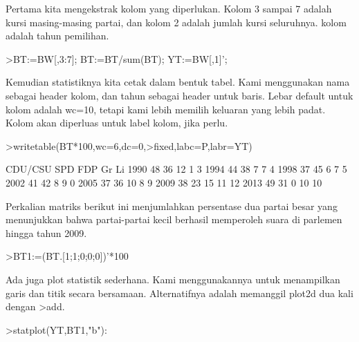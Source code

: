 \documentclass[a4paper,10pt]{article}
\begin{document}
\begin{eulernotebook}
\begin{eulercomment}
\begin{eulercomment}
\begin{eulercomment}
Pertama kita mengekstrak kolom yang diperlukan. Kolom 3 sampai 7
adalah kursi masing-masing partai, dan kolom 2 adalah jumlah kursi
seluruhnya. kolom adalah tahun pemilihan.
\end{eulercomment}
\begin{eulerprompt}
>BT:=BW[,3:7]; BT:=BT/sum(BT); YT:=BW[,1]';
\end{eulerprompt}
\begin{eulercomment}
Kemudian statistiknya kita cetak dalam bentuk tabel. Kami menggunakan
nama sebagai header kolom, dan tahun sebagai header untuk baris. Lebar
default untuk kolom adalah wc=10, tetapi kami lebih memilih keluaran
yang lebih padat. Kolom akan diperluas untuk label kolom, jika perlu.
\end{eulercomment}
\begin{eulerprompt}
>writetable(BT*100,wc=6,dc=0,>fixed,labc=P,labr=YT)
\end{eulerprompt}
\begin{euleroutput}
         CDU/CSU   SPD   FDP    Gr    Li
    1990      48    36    12     1     3
    1994      44    38     7     7     4
    1998      37    45     6     7     5
    2002      41    42     8     9     0
    2005      37    36    10     8     9
    2009      38    23    15    11    12
    2013      49    31     0    10    10
\end{euleroutput}
\begin{eulercomment}
Perkalian matriks berikut ini menjumlahkan persentase dua partai besar
yang menunjukkan bahwa partai-partai kecil berhasil memperoleh suara
di parlemen hingga tahun 2009.
\end{eulercomment}
\begin{eulerprompt}
>BT1:=(BT.[1;1;0;0;0])'*100
\end{eulerprompt}
\begin{euleroutput}
  [84.29,  81.25,  81.1659,  82.7529,  72.9642,  61.8971,  79.8732]
\end{euleroutput}
\begin{eulercomment}
Ada juga plot statistik sederhana. Kami menggunakannya untuk
menampilkan garis dan titik secara bersamaan. Alternatifnya adalah
memanggil plot2d dua kali dengan \textgreater{}add.
\end{eulercomment}
\begin{eulerprompt}
>statplot(YT,BT1,"b"):
\end{eulerprompt}
\begin{eulercomment}

\end{eulercomment}
\end{eulercomment}
\end{eulercomment}
\end{eulernotebook}
\end{document}
